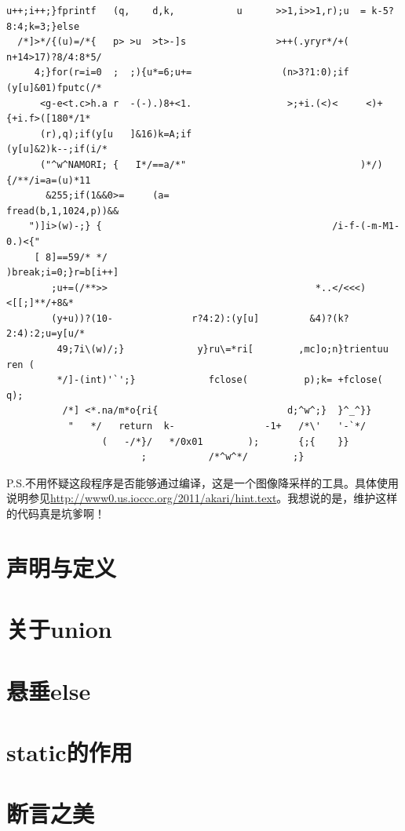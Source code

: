 \documentclass[a4paper]{book}
\begin{document}
{\begin{shaded}
\begin{verbatim}
u++;i++;}fprintf   (q,    d,k,           u      >>1,i>>1,r);u  = k-5?8:4;k=3;}else
  /*]>*/{(u)=/*{   p> >u  >t>-]s                >++(.yryr*/+(    n+14>17)?8/4:8*5/
     4;}for(r=i=0  ;  ;){u*=6;u+=                (n>3?1:0);if    (y[u]&01)fputc(/*
      <g-e<t.c>h.a r  -(-).)8+<1.                 >;+i.(<)<     <)+{+i.f>([180*/1*
      (r),q);if(y[u   ]&16)k=A;if                               (y[u]&2)k--;if(i/*
      ("^w^NAMORI; {   I*/==a/*"                               )*/){/**/i=a=(u)*11
       &255;if(1&&0>=     (a=                                 fread(b,1,1024,p))&&
	")]i>(w)-;} {                                         /i-f-(-m-M1-0.)<{"
	 [ 8]==59/* */                                       )break;i=0;}r=b[i++]
	    ;u+=(/**>>                                     *..</<<<)<[[;]**/+8&*
	    (y+u))?(10-              r?4:2):(y[u]         &4)?(k?2:4):2;u=y[u/*
	     49;7i\(w)/;}             y}ru\=*ri[        ,mc]o;n}trientuu ren (
	     */]-(int)'`';}             fclose(          p);k= +fclose( q);
	      /*] <*.na/m*o{ri{                       d;^w^;}  }^_^}}
	       "   */   return  k-                -1+   /*\'   '-`*/
	             (   -/*}/   */0x01        );       {;{    }}
	                    ;           /*^w^*/        ;}
\end{verbatim}\end{shaded}}
P.S.不用怀疑这段程序是否能够通过编译，这是一个图像降采样的工具。具体使用说明参见\url{http://www0.us.ioccc.org/2011/akari/hint.text}。我想说的是，维护这样的代码真是坑爹啊！

\section{声明与定义}

\section{关于union}

\section{悬垂else}

\section{static的作用}

\section{断言之美}
\end{document}
